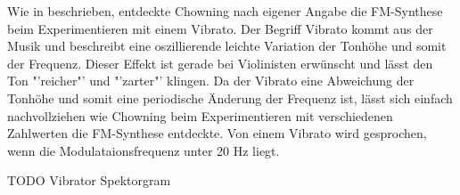 Wie in  beschrieben, entdeckte Chowning nach eigener Angabe die FM-Synthese beim Experimentieren mit einem Vibrato. Der Begriff Vibrato kommt aus der Musik und beschreibt eine oszillierende leichte Variation der Tonhöhe und somit der Frequenz. Dieser Effekt ist gerade bei Violinisten erwünscht und lässt den Ton "'reicher"' und "'zarter"' klingen. \cite[S. 422]{tobias} Da der Vibrato eine Abweichung der Tonhöhe und somit eine periodische Änderung der Frequenz ist, lässt sich einfach nachvollziehen wie Chowning beim Experimentieren mit verschiedenen Zahlwerten die FM-Synthese entdeckte. Von einem Vibrato wird gesprochen, wenn die Modulataionsfrequenz unter 20 Hz liegt.

TODO Vibrator Spektorgram













\FloatBarrier 